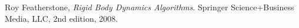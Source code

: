 
\clearpage
{}
\begin{thebibliography}{9}

  Roy Featherstone,
  \emph{Rigid Body Dynamics Algorithms}.
  Springer Science+Business Media, LLC,
  2nd edition,
  2008.

\end{thebibliography}
